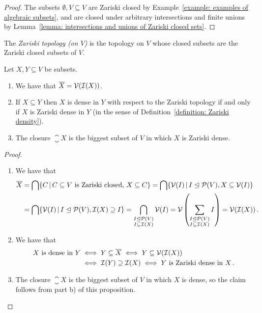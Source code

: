 \begin{proof}
  The subsets $\emptyset, V \subseteq V$ are Zariski closed by Example~\ref{example: examples of algebraic subsets}, and are closed under arbitrary intersections and finite unions by Lemma~\ref{lemma: intersections and unions of Zariski closed sets}.
\end{proof}


\begin{definition}
  The \emph{Zariski topology \textup(on $V$\textup)} is the topology on $V$ whose closed subsets are the Zariski closed subsets of $V$.
\end{definition}


\begin{proposition}
  \label{proposition: characterization of Zariski closed and Zariski dense}
  Let $X, Y \subseteq V$ be subsets.
  \begin{enumerate}
    \item
      We have that $\overline{X} = \mathcal{V}(\mathcal{I}(X))$.
    \item
      If $X \subseteq Y$ then $X$ is dense in $Y$ with respect to the Zariski topology if and only if $X$ is Zariski dense in $Y$ (in the sense of Definition~\ref{definition: Zariski density}).
    \item
      The closure $\closure{X}$ is the biggest subset of $V$ in which $X$ is Zariski dense.
  \end{enumerate}
\end{proposition}


\begin{proof}
  \leavevmode
  \begin{enumerate}
    \item
      We have that
      \begin{align*}
            \closure{X}
        &=  \bigcap \{ C \suchthat \text{$C \subseteq V$ is Zariski closed, $X \subseteq C$} \}
         =  \bigcap \{ \mc{V}(I) \suchthat I \idealeq \mc{P}(V), X \subseteq \mc{V}(I) \} \\
        &=  \bigcap \{ \mc{V}(I) \suchthat I \idealeq \mc{P}(V), \mc{I}(X) \supseteq I \}
         =  \bigcap_{\substack{I \idealeq \mc{P}(V) \\ I \subseteq \mc{I}(X)}} \mc{V}(I)
         =  \mc{V}\left( \sum_{\substack{I \idealeq \mc{P}(V) \\ I \subseteq \mc{I}(X)}} I \right)
         =  \mc{V}(\mc{I}(X)) \,.
      \end{align*}
    \item
      We have that
      \begin{align*}
              \text{$X$ is dense in $Y$}
        &\iff Y \subseteq \overline{X}
         \iff Y \subseteq \mathcal{V}(\mathcal{I}(X)) \\
        &\iff \mathcal{I}(Y) \supseteq \mathcal{I}(X)
         \iff \text{$Y$ is Zariski dense in $X$} \,.
      \end{align*}
    \item
      The closure $\closure{X}$ is the biggest subset of $V$ in which $X$ is dense, so the claim follows from part b) of this proposition.
    \qedhere
  \end{enumerate}
\end{proof}



